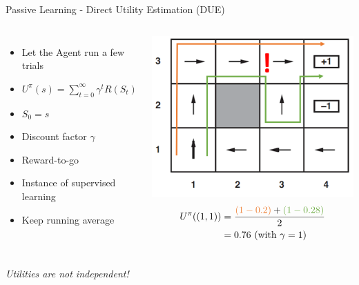 \begin{frame}[c]{Passive Learning - Direct Utility Estimation (DUE)}
\begin{columns}[c]
	\begin{itemize}
		\item Let the Agent run a few trials
		\item $U^{\pi}(s)=\sum_{t=0}^{\infty}\gamma^{t}R(S_{t})$
		\item $S_{0}=s$
		\item Discount factor $\gamma$
		\item Reward-to-go
		\item Instance of supervised learning
		\item Keep running average
	\end{itemize}
	\pause
		\includegraphics[width=0.9\linewidth]{img-elias/DUE_example.png}
		\begin{align*}
			U^{\pi}((1,1))&=\frac{\color{PPorange}(1-0.2)\color{black}+\color{PPgreen}(1-0.28)}{2}\\
			&=0.76\text{ (with }\gamma=1\text{)}
		\end{align*}
\end{columns}
\pause
\begin{center}
	\textit{Utilities are not independent!}
\end{center}
\end{frame}

